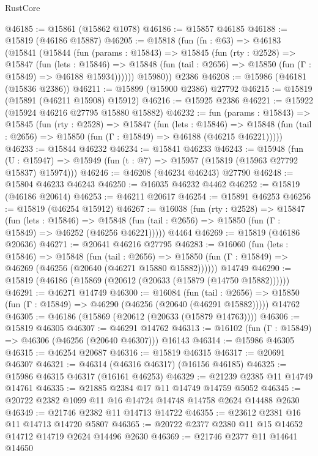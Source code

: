 \begin{lexlean}{RustCore}
\begin{coremodule}
@46185 := @15861 (@15862 @1078)
@46186 := @15857 @46185
@46188 := @15819 (@46186 @15887)
@46205 := @15818
    (fun (fn : @63) =>
    @46183
      (@15841
        (@15844
          (fun (params : @15843) =>
          @15845
            (fun (rty : @2528) =>
            @15847
              (fun (lets : @15846) =>
              @15848 (fun (tail : @2656) => @15850 (fun (Γ : @15849) => @46188 @15934))))))
        @15980))
    @2386
@46208 := @15986 (@46181 (@15836 @2386))
@46211 := @15899 (@15900 @2386) @27792
@46215 := @15819 (@15891 (@46211 @15908) @15912)
@46216 := @15925 @2386
@46221 := @15922 (@15924 @46216 @27795 @15880 @15882)
@46232 := fun (params : @15843) =>
  @15845
    (fun (rty : @2528) =>
    @15847
      (fun (lets : @15846) =>
      @15848 (fun (tail : @2656) => @15850 (fun (Γ : @15849) => @46188 (@46215 @46221)))))
@46233 := @15844 @46232
@46234 := @15841 @46233
@46243 := @15948
    (fun (U : @15947) => @15949 (fun (t : @7) => @15957 (@15819 (@15963 @27792 @15837) @15974)))
@46246 := @46208 (@46234 @46243) @27790
@46248 := @15804 @46233 @46243
@46250 := @16035 @46232 @4462
@46252 := @15819 (@46186 @20614)
@46253 := @46211 @20617
@46254 := @15891 @46253
@46256 := @15819 (@46254 @15912)
@46267 := @16038
    (fun (rty : @2528) =>
    @15847
      (fun (lets : @15846) =>
      @15848 (fun (tail : @2656) => @15850 (fun (Γ : @15849) => @46252 (@46256 @46221)))))
    @4464
@46269 := @15819 (@46186 @20636)
@46271 := @20641 @46216 @27795
@46283 := @16060
    (fun (lets : @15846) =>
    @15848
      (fun (tail : @2656) =>
      @15850 (fun (Γ : @15849) => @46269 (@46256 (@20640 (@46271 @15880 @15882))))))
    @14749
@46290 := @15819 (@46186 (@15869 (@20612 (@20633 (@15879 (@14750 @15882))))))
@46291 := @46271 @14749
@46300 := @16084
    (fun (tail : @2656) => @15850 (fun (Γ : @15849) => @46290 (@46256 (@20640 (@46291 @15882)))))
    @14762
@46305 := @46186 (@15869 (@20612 (@20633 (@15879 @14763))))
@46306 := @15819 @46305
@46307 := @46291 @14762
@46313 := @16102 (fun (Γ : @15849) => @46306 (@46256 (@20640 @46307))) @16143
@46314 := @15986 @46305
@46315 := @46254 @20687
@46316 := @15819 @46315
@46317 := @20691 @46307
@46321 := @46314 (@46316 @46317) (@16156 @46185)
@46325 := @15986 @46315 @46317 (@16161 @46253)
@46329 := @21239 @2385 @11 @14749 @14761
@46335 := @21885 @2384 @17 @11 @14749 @14759 @5052
@46345 := @20722 @2382 @1099 @11 @16 @14724 @14748 @14758 @2624 @14488 @2630
@46349 := @21746 @2382 @11 @14713 @14722
@46355 := @23612 @2381 @16 @11 @14713 @14720 @5807
@46365 := @20722 @2377 @2380 @11 @15 @14652 @14712 @14719 @2624 @14496 @2630
@46369 := @21746 @2377 @11 @14641 @14650

\end{coremodule}
\end{lexlean}
